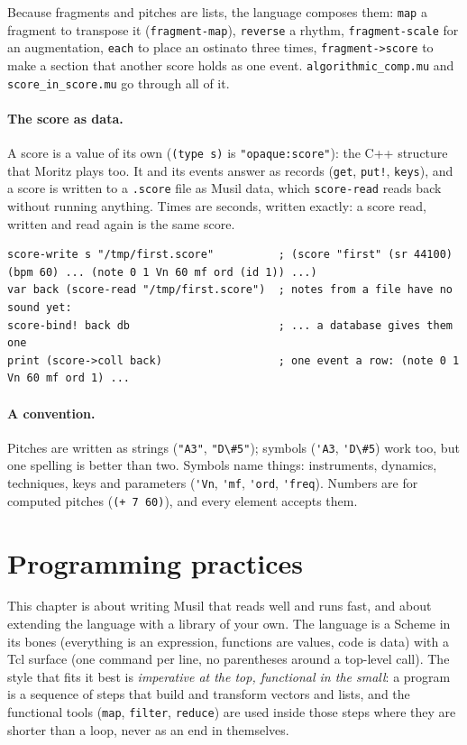 \documentclass[11pt,a4paper]{article}
\newcommand{\musil}[1]{\lstinline[style=musilinline]{#1}}
\begin{document}
Because fragments and pitches are lists, the language composes them: \musil{map} a
fragment to transpose it (\musil{fragment-map}), \musil{reverse} a rhythm,
\musil{fragment-scale} for an augmentation, \musil{each} to place an ostinato three times,
\musil{fragment->score} to make a section that another score holds as one event.
\texttt{algorithmic\_comp.mu} and \texttt{score\_in\_score.mu} go through all of it.

\paragraph{The score as data.} A score is a value of its own (\musil{(type s)} is
\musil{"opaque:score"}): the C++ structure that Moritz plays too. It and its events answer as
records (\musil{get}, \musil{put!}, \musil{keys}), and a score is written to a \texttt{.score} file as
Musil data, which \musil{score-read} reads back without running anything. Times are seconds, written
exactly: a score read, written and read again is the same score.

\begin{lstlisting}
score-write s "/tmp/first.score"          ; (score "first" (sr 44100) (bpm 60) ... (note 0 1 Vn 60 mf ord (id 1)) ...)
var back (score-read "/tmp/first.score")  ; notes from a file have no sound yet:
score-bind! back db                       ; ... a database gives them one
print (score->coll back)                  ; one event a row: (note 0 1 Vn 60 mf ord 1) ...
\end{lstlisting}

\paragraph{A convention.} Pitches are written as strings (\musil{"A3"}, \musil{"D\#5"}); symbols
(\musil{'A3}, \musil{'D\#5}) work too, but one spelling is better than two. Symbols name things: instruments, dynamics, techniques, keys and parameters
(\musil{'Vn}, \musil{'mf}, \musil{'ord}, \musil{'freq}). Numbers are for computed pitches
(\musil{(+ 7 60)}), and every element accepts them.

\section{Programming practices}
\label{sec:practices}

This chapter is about writing Musil that reads well and runs fast, and about extending
the language with a library of your own. The language is a Scheme in its bones
(everything is an expression, functions are values, code is data) with a Tcl surface (one
command per line, no parentheses around a top-level call). The style that fits it best is
\emph{imperative at the top, functional in the small}: a program is a sequence of steps
that build and transform vectors and lists, and the functional tools (\musil{map},
\musil{filter}, \musil{reduce}) are used inside those steps where they are shorter than a
loop, never as an end in themselves.
\end{document}
